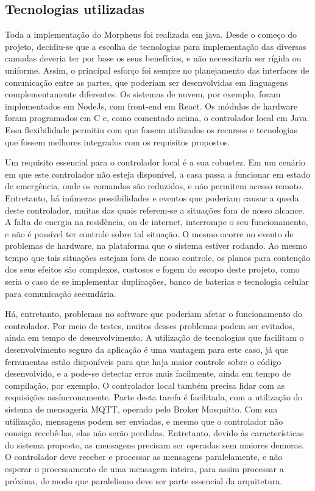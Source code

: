 \subsection{Tecnologias utilizadas}
Toda a implementação do Morpheus foi realizada em java. Desde o começo do projeto, decidiu-se que a escolha de tecnologias para implementação das diversas camadas deveria ter por base os seus benefícios, e não necessitaria ser rígida ou uniforme. Assim, o principal esforço foi sempre no planejamento das interfaces de comunicação entre as partes, que poderiam ser desenvolvidas em linguagens complementamente diferentes. Os sistemas de nuvem, por exemplo, foram implementados em NodeJs, com front-end em React. Os módulos de hardware foram programados em C e, como comentado acima, o controlador local em Java.
Essa flexibilidade permitiu com que fossem utilizados os recursos e tecnologias que fossem melhores integrados com os requisitos propostos. 

Um requisito essencial para o controlador local é a sua robustez. Em um cenário em que este controlador não esteja disponível, a casa passa a funcionar em estado de emergência, onde os comandos são reduzidos, e não permitem acesso remoto. Entretanto, há inúmeras possibilidades e eventos que poderiam causar a queda deste controlador, muitas das quais referem-se a situações fora de nosso alcance. A falta de energia na residência, ou de internet, interrompe o seu funcionamento, e não é possível ter controle sobre tal situação. O mesmo ocorre no evento de problemas de hardware, na plataforma que o sistema estiver rodando. Ao mesmo tempo que tais situações estejam fora de nosso controle, os planos para contenção dos seus efeitos são complexos, custosos e fogem do escopo deste projeto, como seria o caso de se implementar duplicações, banco de baterias e tecnologia celular para comunicação secundária.

Há, entretanto, problemas no software que poderiam afetar o funcionamento do controlador. Por meio de testes, muitos desses problemas podem ser evitados, ainda em tempo de desenvolvimento. A utilização de tecnologias que facilitam o desenvolvimento seguro da aplicação é uma vantagem para este caso, já que ferramentas estão disponíveis para que haja maior controle sobre o código desenvolvido, e a pode-se detectar erros mais facilmente, ainda em tempo de compilação, por exemplo.
O controlador local também precisa lidar com as requisições assíncronamente. Parte desta tarefa é facilitada, com a utilização do sistema de mensageria MQTT, operado pelo Broker Mosquitto. Com sua utilização, mensagens podem ser enviadas, e mesmo que o controlador não consiga recebê-las, elas não serão perdidas. Entretanto, devido às características do sistema proposto, as mensagens precisam ser operadas sem maiores demoras. O controlador deve receber e processar as mensagens paralelamente, e não esperar o processamento de uma mensagem inteira, para assim processar a próxima, de modo que paralelismo deve ser parte essencial da arquitetura.

